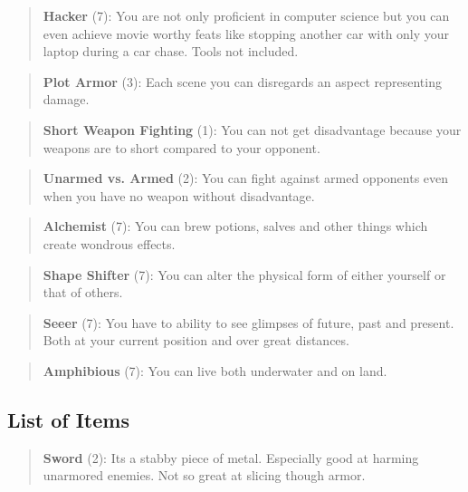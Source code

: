 \documentclass[11pt]{article}
\begin{document}
{\begin{quote}
\textbf{Hacker} (7): You are not only proficient in computer science but you can even achieve movie worthy feats like stopping another car with only your laptop during a car chase. Tools not included.
\end{quote}

\begin{quote}
\textbf{Plot Armor} (3): Each scene you can disregards an aspect representing damage. 
\end{quote}

\begin{quote}
\textbf{Short Weapon Fighting} (1): You can not get disadvantage because your weapons are to short compared to your opponent.
\end{quote}

\begin{quote}
\textbf{Unarmed vs. Armed} (2): You can fight against armed opponents even when you have no weapon without disadvantage.
\end{quote}

\begin{quote}
\textbf{Alchemist} (7): You can brew potions, salves and other things which create wondrous effects.
\end{quote}

\begin{quote}
\textbf{Shape Shifter} (7): You can alter the physical form of either yourself or that of others.
\end{quote}

\begin{quote}
\textbf{Seeer} (7): You have to ability to see glimpses of future, past and present. Both at your current position and over great distances. 
\end{quote}

\begin{quote}
\textbf{Amphibious} (7): You can live both underwater and on land.
\end{quote}


\subsection{List of Items}
\label{sec:orge59c6d9}
\begin{quote}
\textbf{Sword} (2): Its a stabby piece of metal. Especially good at harming unarmored enemies. Not so great at slicing though armor. 
\end{quote}

}
\end{document}
